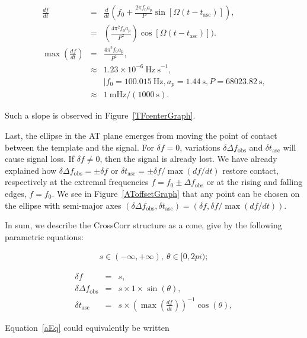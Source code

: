 \documentclass{article}
\begin{document}
\begin{eqnarray}
  \frac{df}{dt}
      &=& \frac{d}{dt} \left(f_0 + \frac{2 \pi f_0 a_p}{P} \sin \left[\Omega(t - t_\mathrm{asc})\right]\right),\\
      &=& \left(\frac{4 \pi^2 f_0 a_p}{P^2} \right) \cos[\Omega(t - t_\mathrm{asc})]). \\
  \max \left(\frac{df}{dt} \right)
      &=& \frac{4 \pi^2 f_0 a_p}{P^2},\\
      &\approx& 1.23 \times 10^{-6} \mathrm{~Hz~s}^{-1}, \nonumber\\
      &~& \mid {f_0 = 100.015\mathrm{~Hz}, a_p = 1.44\mathrm{~s}, P = 68023.82\mathrm{~s} },\\
      &\approx& 1\mathrm{~mHz} / (1000\mathrm{~s}).
\end{eqnarray}

\noindent Such a slope is observed in Figure~\ref{TFcenterGraph}.

Last, the ellipse in the AT plane emerges from moving the point of contact between the template and the signal.
For $\delta f = 0$, variations $\delta \Delta f_\mathrm{obs}$ and $\delta t_\mathrm{asc}$ will cause signal loss.
If $\delta f \neq 0$, then the signal is already lost.
We have already explained how $\delta \Delta f_\mathrm{obs} = \pm \delta f$ or $\delta t_\mathrm{asc} = \pm \delta f / \max (df/dt)$ restore contact, respectively at the extremal frequencies $f = f_0 \pm \Delta f_\mathrm{obs}$ or at the rising and falling edges, $f = f_0$.
We see in Figure~\ref{AToffsetGraph} that any point can be chosen on the ellipse with semi-major axes $(\delta \Delta f_\mathrm{obs}, \delta t_\mathrm{asc}) = (\delta f, \delta f/ \max (df /dt))$.

In sum, we describe the CrossCorr structure as a cone, give by the following parametric equations:

\begin{eqnarray}
s \in (-\infty, +\infty),~\theta \in [0, 2 pi);
\end{eqnarray}

\begin{eqnarray}
\delta f                        &=& s, \label{fEq}\\
\delta \Delta f_\mathrm{obs} &=& s \times 1 \times \sin(\theta), \label{aEq}\\
\delta t_\mathrm{asc}                  &=& s \times \left(\max\left(\frac{df}{dt} \right)\right)^{-1} \cos(\theta) \label{tEq},
\end{eqnarray}

\noindent Equation~\ref{aEq} could equivalently be written
\end{document}
